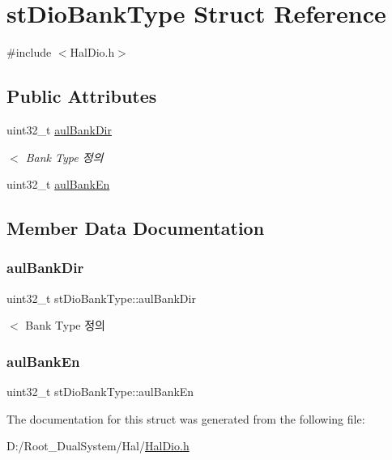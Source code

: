 \hypertarget{structst_dio_bank_type}{}\section{st\+Dio\+Bank\+Type Struct Reference}
\label{structst_dio_bank_type}


{\ttfamily \#include $<$Hal\+Dio.\+h$>$}

\subsection*{Public Attributes}
\begin{DoxyCompactItemize}
\item 
uint32\+\_\+t \mbox{\hyperlink{structst_dio_bank_type_af17c6cd9daf08bd0372e1af68f2c7c47}{aul\+Bank\+Dir}}
\begin{DoxyCompactList}\small\item\em $<$ Bank Type 정의 \end{DoxyCompactList}\item 
uint32\+\_\+t \mbox{\hyperlink{structst_dio_bank_type_a6a79e12dadb625ce10f43f2b18ca20b2}{aul\+Bank\+En}}
\end{DoxyCompactItemize}


\subsection{Member Data Documentation}
\mbox{\label{structst_dio_bank_type_af17c6cd9daf08bd0372e1af68f2c7c47}} 
\subsubsection{\texorpdfstring{aul\+Bank\+Dir}{aulBankDir}}
{\footnotesize\ttfamily uint32\+\_\+t st\+Dio\+Bank\+Type\+::aul\+Bank\+Dir}



$<$ Bank Type 정의 

\mbox{\label{structst_dio_bank_type_a6a79e12dadb625ce10f43f2b18ca20b2}} 
\subsubsection{\texorpdfstring{aul\+Bank\+En}{aulBankEn}}
{\footnotesize\ttfamily uint32\+\_\+t st\+Dio\+Bank\+Type\+::aul\+Bank\+En}



The documentation for this struct was generated from the following file\+:\begin{DoxyCompactItemize}
\item 
D\+:/\+Root\+\_\+\+Dual\+System/\+Hal/\mbox{\hyperlink{_hal_dio_8h}{Hal\+Dio.\+h}}\end{DoxyCompactItemize}
